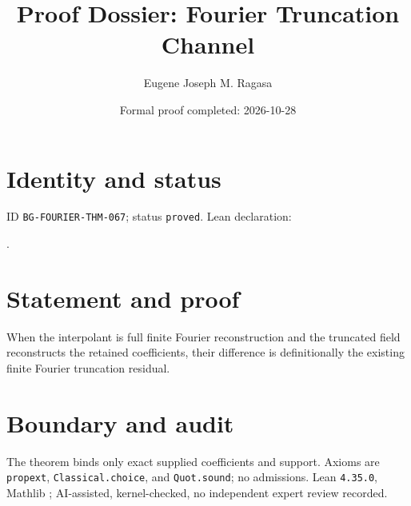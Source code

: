 \documentclass[11pt]{article}
\title{Proof Dossier: Fourier Truncation Channel}\author{Eugene Joseph M. Ragasa}\date{Formal proof completed: 2026-10-28}
\begin{document}
\raggedright\maketitle
\section{Identity and status}
ID \texttt{BG-FOURIER-THM-067}; status \texttt{proved}. Lean declaration:
\par{}.
\section{Statement and proof}
When the interpolant is full finite Fourier reconstruction and the truncated field reconstructs the retained coefficients, their difference is definitionally the existing finite Fourier truncation residual.
\section{Boundary and audit}
The theorem binds only exact supplied coefficients and support. Axioms are \texttt{propext}, \texttt{Classical.choice}, and \texttt{Quot.sound}; no admissions. Lean \texttt{4.35.0}, Mathlib {\scriptsize{}}; AI-assisted, kernel-checked, no independent expert review recorded.
\end{document}
